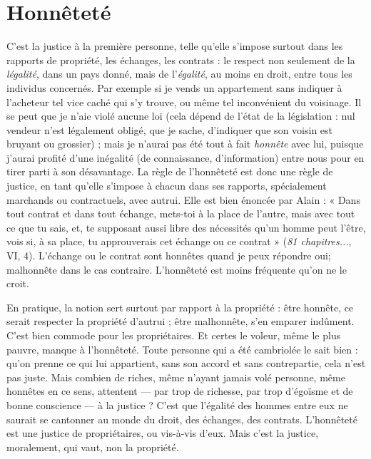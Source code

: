 \section{Honnêteté}
C’est la justice à la première personne, telle qu’elle s'impose
surtout dans les rapports de propriété, les échanges, les
contrats : le respect non seulement de la {\it légalité}, dans un pays donné, mais de
l'{\it égalité}, au moins en droit, entre tous les individus concernés. Par exemple si je
vends un appartement sans indiquer à l’acheteur tel vice caché qui s’y trouve,
ou même tel inconvénient du voisinage. Il se peut que je n’aie violé aucune loi
(cela dépend de l’état de la législation : nul vendeur n’est légalement obligé, que
je sache, d’indiquer que son voisin est bruyant ou grossier) ; mais je n’aurai pas
été tout à fait {\it honnête} avec lui, puisque j'aurai profité d’une inégalité (de
connaissance, d’information) entre nous pour en tirer parti à son désavantage.
La règle de l'honnêteté est donc une règle de justice, en tant qu’elle s'impose à
chacun dans ses rapports, spécialement marchands ou contractuels, avec autrui.
Elle est bien énoncée par Alain : « Dans tout contrat et dans tout échange,
mets-toi à la place de l’autre, mais avec tout ce que tu sais, et, te supposant aussi
libre des nécessités qu’un homme peut l'être, vois si, à sa place, tu approuverais
cet échange ou ce contrat » ({\it 81 chapitres...}, VI, 4). L’échange ou le contrat sont
honnêtes quand je peux répondre oui; malhonnête dans le cas contraire.
L’honnêteté est moins fréquente qu’on ne le croit.

En pratique, la notion sert surtout par rapport à la propriété : être honnête,
ce serait respecter la propriété d’autrui ; être malhonnête, s’en emparer indûment.
C’est bien commode pour les propriétaires. Et certes le voleur, même le
plus pauvre, manque à l'honnêteté. Toute personne qui a été cambriolée le sait
bien : qu’on prenne ce qui lui appartient, sans son accord et sans contrepartie,
cela n’est pas juste. Mais combien de riches, même n’ayant jamais volé personne,
même honnêtes en ce sens, attentent — par trop de richesse, par trop
d’égoïsme et de bonne conscience — à la justice ? C’est que l'égalité des hommes
entre eux ne saurait se cantonner au monde du droit, des échanges, des
contrats. L’honnêteté est une justice de propriétaires, ou vis-à-vis d'eux. Mais
c’est la justice, moralement, qui vaut, non la propriété.

